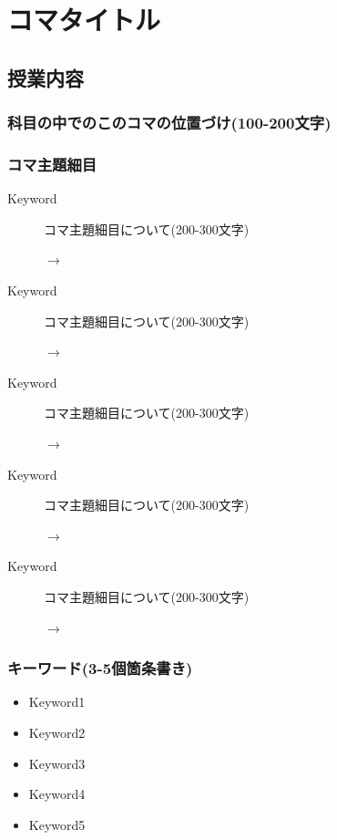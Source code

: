 \section{コマタイトル}
\subsection{授業内容}
\subsubsection{科目の中でのこのコマの位置づけ(100-200文字)}
\subsubsection{コマ主題細目}
\begin{description}
\item[Keyword]コマ主題細目について(200-300文字)
\begin{flushright}
    $\to$
\end{flushright}

\item[Keyword]コマ主題細目について(200-300文字)
\begin{flushright}
    $\to$
\end{flushright}

\item[Keyword]コマ主題細目について(200-300文字)
\begin{flushright}
    $\to$
\end{flushright}

\item[Keyword]コマ主題細目について(200-300文字)
\begin{flushright}
    $\to$
\end{flushright}

\item[Keyword]コマ主題細目について(200-300文字)
\begin{flushright}
    $\to$
\end{flushright}

\end{description}
\subsubsection{キーワード(3-5個箇条書き)}
\begin{itemize}
\item Keyword1
\item Keyword2
\item Keyword3
\item Keyword4
\item Keyword5
\end{itemize}

